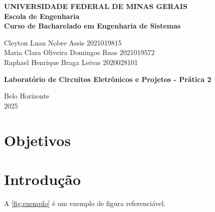 \documentclass[
	12pt,				%
	oneside,			%
	a4paper,			%
	chapter=TITLE,
	sumario=tradicional,
	english,			%
	brazil				%
]{abntex2}
\begin{document}

\frenchspacing 

\begin{center}
\textbf{UNIVERSIDADE FEDERAL DE MINAS GERAIS\\
Escola de Engenharia \\
Curso de Bacharelado em Engenharia de Sistemas}

\vspace{4cm}

Cleyton Luan Nobre Assis 2021019815 \\
Maria Clara Oliveira Domingos Ruas 2021019572 \\
Raphael Henrique Braga Leivas 2020028101

\vspace{4cm}  

{ \textbf{Laboratório de Circuitos Eletrônicos e Projetos - Prática 2} }

\vfill
{Belo Horizonte \\
2025 }
\end{center}

\newpage

\tableofcontents*
\cleardoublepage

\textual

\pagestyle{simple}
	
\chapter{Objetivos}\label{cap:objetivos} 

\lipsum[1-2]

\chapter{Introdução}\label{cap:introdução} 

A \autoref{fig:exemplo} é um exemplo de figura referenciável.
\end{document}
